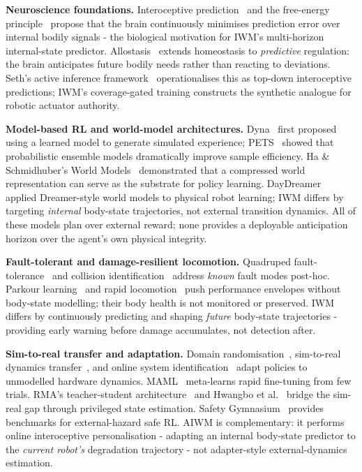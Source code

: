 \documentclass{article}
\begin{document}
{\textbf{Neuroscience foundations.}
Interoceptive prediction~\citep{barrett2015interoception} and the free-energy principle~\citep{friston2010freeenergy} propose that the brain continuously minimises prediction error over internal bodily signals - the biological motivation for IWM's multi-horizon internal-state predictor. Allostasis~\citep{sterling2012allostasis} extends homeostasis to \emph{predictive} regulation: the brain anticipates future bodily needs rather than reacting to deviations. Seth's active inference framework~\citep{seth2013interoceptive} operationalises this as top-down interoceptive predictions; IWM's coverage-gated training constructs the synthetic analogue for robotic actuator authority.

\textbf{Model-based RL and world-model architectures.}
Dyna~\citep{sutton1991dyna} first proposed using a learned model to generate simulated experience; PETS~\citep{chua2018pets} showed that probabilistic ensemble models dramatically improve sample efficiency. Ha \& Schmidhuber's World Models~\citep{ha2018worldmodels} demonstrated that a compressed world representation can serve as the substrate for policy learning. DayDreamer~\citep{wu2023daydreamer} applied Dreamer-style world models to physical robot learning; IWM differs by targeting \emph{internal} body-state trajectories, not external transition dynamics. All of these models plan over external reward; none provides a deployable anticipation horizon over the agent's own physical integrity.

\textbf{Fault-tolerant and damage-resilient locomotion.}
Quadruped fault-tolerance~\citep{chu2025acl,hou2024multitask} and collision identification~\citep{haddadin2017robot} address \emph{known} fault modes post-hoc. Parkour learning~\citep{zhuang2023robot} and rapid locomotion~\citep{margolis2023rapid} push performance envelopes without body-state modelling; their body health is not monitored or preserved. IWM differs by continuously predicting and shaping \emph{future} body-state trajectories - providing early warning before damage accumulates, not detection after.

\textbf{Sim-to-real transfer and adaptation.}
Domain randomisation~\citep{tobin2017domain}, sim-to-real dynamics transfer~\citep{peng2018simtoreal}, and online system identification~\citep{yu2017preparing} adapt policies to unmodelled hardware dynamics. MAML~\citep{finn2017maml} meta-learns rapid fine-tuning from few trials. RMA's teacher-student architecture~\citep{kumar2021rma} and Hwangbo et al.~\citep{hwangbo2019learning} bridge the sim-real gap through privileged state estimation. Safety Gymnasium~\citep{ji2023safetygymnasium} provides benchmarks for external-hazard safe RL. AIWM is complementary: it performs online interoceptive personalisation - adapting an internal body-state predictor to the \emph{current robot's} degradation trajectory - not adapter-style external-dynamics estimation.

}
\end{document}
